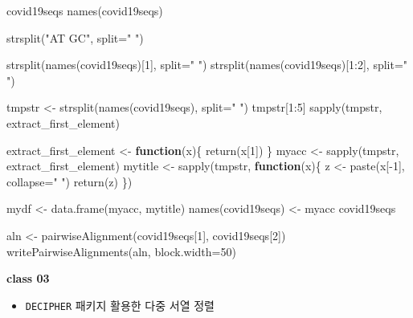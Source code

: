 \documentclass[
]{book}
\newenvironment{Shaded}{\begin{snugshade}}{\end{snugshade}}
\newcommand{\AttributeTok}[1]{\textcolor[rgb]{0.77,0.63,0.00}{#1}}
\newcommand{\ControlFlowTok}[1]{\textcolor[rgb]{0.13,0.29,0.53}{\textbf{#1}}}
\newcommand{\DecValTok}[1]{\textcolor[rgb]{0.00,0.00,0.81}{#1}}
\newcommand{\FunctionTok}[1]{\textcolor[rgb]{0.00,0.00,0.00}{#1}}
\newcommand{\NormalTok}[1]{#1}
\newcommand{\OtherTok}[1]{\textcolor[rgb]{0.56,0.35,0.01}{#1}}
\newcommand{\SpecialCharTok}[1]{\textcolor[rgb]{0.00,0.00,0.00}{#1}}
\newcommand{\StringTok}[1]{\textcolor[rgb]{0.31,0.60,0.02}{#1}}
\providecommand{\tightlist}{%
  \setlength{\itemsep}{0pt}\setlength{\parskip}{0pt}}
\begin{document}
\begin{Shaded}
\begin{Highlighting}[]
\NormalTok{covid19seqs}
\FunctionTok{names}\NormalTok{(covid19seqs)}

\FunctionTok{strsplit}\NormalTok{(}\StringTok{"AT GC"}\NormalTok{, }\AttributeTok{split=}\StringTok{" "}\NormalTok{)}

\FunctionTok{strsplit}\NormalTok{(}\FunctionTok{names}\NormalTok{(covid19seqs)[}\DecValTok{1}\NormalTok{], }\AttributeTok{split=}\StringTok{" "}\NormalTok{)}
\FunctionTok{strsplit}\NormalTok{(}\FunctionTok{names}\NormalTok{(covid19seqs)[}\DecValTok{1}\SpecialCharTok{:}\DecValTok{2}\NormalTok{], }\AttributeTok{split=}\StringTok{" "}\NormalTok{)}

\NormalTok{tmpstr }\OtherTok{\textless{}{-}} \FunctionTok{strsplit}\NormalTok{(}\FunctionTok{names}\NormalTok{(covid19seqs), }\AttributeTok{split=}\StringTok{" "}\NormalTok{)}
\NormalTok{tmpstr[}\DecValTok{1}\SpecialCharTok{:}\DecValTok{5}\NormalTok{]}
\FunctionTok{sapply}\NormalTok{(tmpstr, extract\_first\_element)}

\NormalTok{extract\_first\_element }\OtherTok{\textless{}{-}} \ControlFlowTok{function}\NormalTok{(x)\{}
  \FunctionTok{return}\NormalTok{(x[}\DecValTok{1}\NormalTok{])}
\NormalTok{\}}
\NormalTok{myacc }\OtherTok{\textless{}{-}} \FunctionTok{sapply}\NormalTok{(tmpstr, extract\_first\_element)}
\NormalTok{mytitle }\OtherTok{\textless{}{-}} \FunctionTok{sapply}\NormalTok{(tmpstr, }\ControlFlowTok{function}\NormalTok{(x)\{}
\NormalTok{  z }\OtherTok{\textless{}{-}} \FunctionTok{paste}\NormalTok{(x[}\SpecialCharTok{{-}}\DecValTok{1}\NormalTok{], }\AttributeTok{collapse=}\StringTok{" "}\NormalTok{)}
  \FunctionTok{return}\NormalTok{(z)}
\NormalTok{  \})}

\NormalTok{mydf }\OtherTok{\textless{}{-}} \FunctionTok{data.frame}\NormalTok{(myacc, mytitle)}
\FunctionTok{names}\NormalTok{(covid19seqs) }\OtherTok{\textless{}{-}}\NormalTok{ myacc}
\NormalTok{covid19seqs}

\NormalTok{aln }\OtherTok{\textless{}{-}} \FunctionTok{pairwiseAlignment}\NormalTok{(covid19seqs[}\DecValTok{1}\NormalTok{], covid19seqs[}\DecValTok{2}\NormalTok{])}
\FunctionTok{writePairwiseAlignments}\NormalTok{(aln, }\AttributeTok{block.width=}\DecValTok{50}\NormalTok{)}
\end{Highlighting}
\end{Shaded}

\textbf{class 03}

\begin{itemize}
\tightlist
\item
  \texttt{DECIPHER} 패키지 활용한 다중 서열 정렬
\end{itemize}
\end{document}
